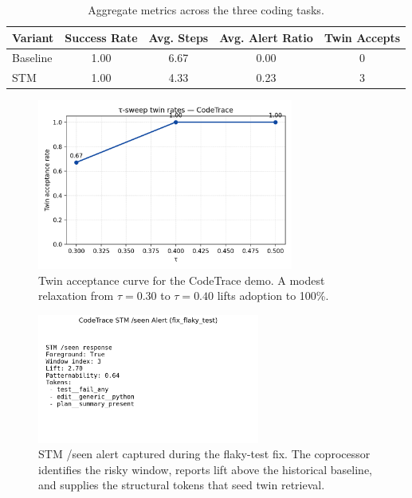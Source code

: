 \documentclass[11pt]{article}
\begin{document}
\begin{table}[h]
  \centering
  \caption{Aggregate metrics across the three coding tasks.}
  \label{tab:codetrace-aggregate}
  \begin{tabular}{lcccc}
    \toprule
    Variant & Success Rate & Avg. Steps & Avg. Alert Ratio & Twin Accepts \\
    \midrule
    Baseline & 1.00 & 6.67 & 0.00 & 0 \\
    STM & 1.00 & 4.33 & 0.23 & 3 \\
    \bottomrule
  \end{tabular}
\end{table}

\begin{figure}[h]
  \centering
  \includegraphics[width=0.75\textwidth]{../note/fig_tau_sweep_codetrace.png}
  \caption{Twin acceptance curve for the CodeTrace demo. A modest relaxation from $\tau=0.30$ to $\tau=0.40$ lifts adoption to 100\%.}
  \label{fig:tau-codetrace}
\end{figure}

\begin{figure}[h]
  \centering
  \includegraphics[width=0.65\textwidth]{figures/codetrace_seen.png}
  \caption{STM {/}seen alert captured during the flaky-test fix. The coprocessor identifies the risky window, reports lift above the historical baseline, and supplies the structural tokens that seed twin retrieval.}
  \label{fig:codetrace-seen}
\end{figure}
\end{document}
